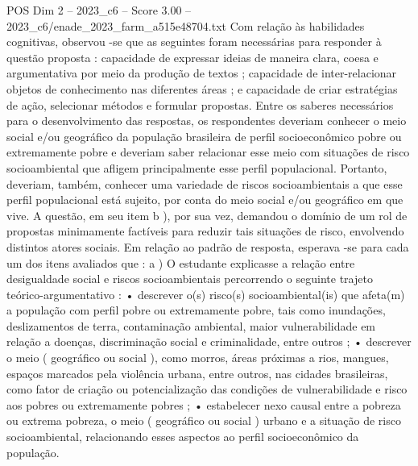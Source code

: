 \begin{textsample}{POS Dim 2 – 2023\_c6 – Score 3.00 – 2023\_c6/enade\_2023\_farm\_a515e48704.txt}
Com relação às habilidades cognitivas, observou -se que as seguintes foram necessárias para responder à questão proposta : capacidade de expressar ideias de maneira clara, coesa e argumentativa por meio da produção de textos ; capacidade de inter-relacionar objetos de conhecimento nas diferentes áreas ; e capacidade de criar estratégias de ação, selecionar métodos e formular propostas.
Entre os saberes necessários para o desenvolvimento das respostas, os respondentes deveriam conhecer o meio social e/ou geográfico da população brasileira de perfil socioeconômico pobre ou extremamente pobre e deveriam saber relacionar esse meio com situações de risco socioambiental que afligem principalmente esse perfil populacional.
Portanto, deveriam, também, conhecer uma variedade de riscos socioambientais a que esse perfil populacional está sujeito, por conta do meio social e/ou geográfico em que vive.
A questão, em seu item b ), por sua vez, demandou o domínio de um rol de propostas minimamente factíveis para reduzir tais situações de risco, envolvendo distintos atores sociais.
Em relação ao padrão de resposta, esperava -se para cada um dos itens avaliados que : a ) O estudante explicasse a relação entre desigualdade social e riscos socioambientais percorrendo o seguinte trajeto teórico-argumentativo : • descrever o(s) risco(s) socioambiental(is) que afeta(m) a população com perfil pobre ou extremamente pobre, tais como inundações, deslizamentos de terra, contaminação ambiental, maior vulnerabilidade em relação a doenças, discriminação social e criminalidade, entre outros ; • descrever o meio ( geográfico ou social ), como morros, áreas próximas a rios, mangues, espaços marcados pela violência urbana, entre outros, nas cidades brasileiras, como fator de criação ou potencialização das condições de vulnerabilidade e risco aos pobres ou extremamente pobres ; • estabelecer nexo causal entre a pobreza ou extrema pobreza, o meio ( geográfico ou social ) urbano e a situação de risco socioambiental, relacionando esses aspectos ao perfil socioeconômico da população.

\end{textsample}

